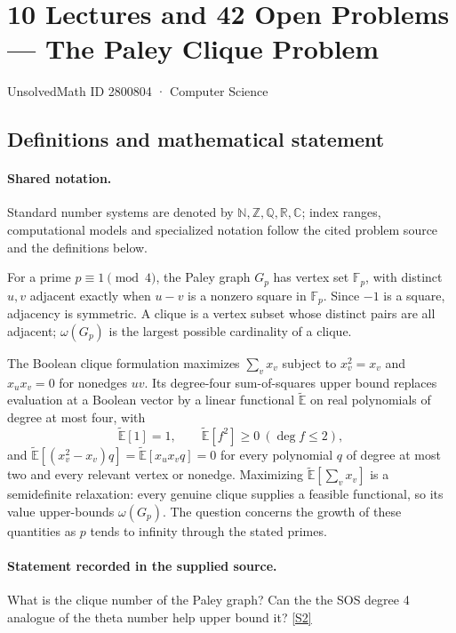 \documentclass[11pt]{article}
\newcommand{\sref}[2]{\hyperlink{source:#1:#2}{[S#2]}}
\begin{document}
\setcounter{section}{2800803}
\section{10 Lectures and 42 Open Problems — The Paley Clique Problem}\label{2800804}
{\small\sffamily UnsolvedMath ID 2800804 · Computer Science}
\subsection{Definitions and mathematical statement}

\paragraph{Shared notation.}Standard number systems are denoted by $\mathbb N,\mathbb Z,\mathbb Q,\mathbb R,\mathbb C$; index ranges, computational models and specialized notation follow the cited problem source and the definitions below.


For a prime $p\equiv1\pmod4$, the Paley graph $G_p$ has vertex set $\mathbb{F}_p$, with distinct $u,v$ adjacent exactly when $u-v$ is a nonzero square in $\mathbb{F}_p$. Since $-1$ is a square, adjacency is symmetric. A clique is a vertex subset whose distinct pairs are all adjacent; $\omega(G_p)$ is the largest possible cardinality of a clique.

The Boolean clique formulation maximizes $\sum_v x_v$ subject to $x_v^2=x_v$ and $x_ux_v=0$ for nonedges $uv$. Its degree-four sum-of-squares upper bound replaces evaluation at a Boolean vector by a linear functional $\widetilde{\mathbb{E}}$ on real polynomials of degree at most four, with
\[
 \widetilde{\mathbb{E}}[1]=1,\qquad
 \widetilde{\mathbb{E}}[f^2]\ge0\ (\deg f\le2),
\]
and $\widetilde{\mathbb{E}}[(x_v^2-x_v)q]=\widetilde{\mathbb{E}}[x_ux_vq]=0$ for every polynomial $q$ of degree at most two and every relevant vertex or nonedge. Maximizing $\widetilde{\mathbb{E}}[\sum_vx_v]$ is a semidefinite relaxation: every genuine clique supplies a feasible functional, so its value upper-bounds $\omega(G_p)$. The question concerns the growth of these quantities as $p$ tends to infinity through the stated primes.
\paragraph{Statement recorded in the supplied source.}
What is the clique number of the Paley graph? Can the the SOS degree 4 analogue of the theta number help upper bound it? \sref{2800804}{2}
\end{document}
